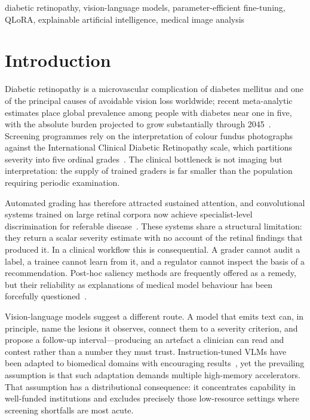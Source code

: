 \documentclass[conference]{IEEEtran}
\begin{document}
\begin{IEEEkeywords}
diabetic retinopathy, vision-language models, parameter-efficient fine-tuning,
QLoRA, explainable artificial intelligence, medical image analysis
\end{IEEEkeywords}

\section{Introduction}

Diabetic retinopathy is a microvascular complication of diabetes mellitus and one
of the principal causes of avoidable vision loss worldwide; recent
meta-analytic estimates place global prevalence among people with diabetes near
one in five, with the absolute burden projected to grow substantially through
2045~\cite{teo2021global}. Screening programmes rely on the interpretation of
colour fundus photographs against the International Clinical Diabetic
Retinopathy scale, which partitions severity into five ordinal
grades~\cite{wilkinson2003proposed}. The clinical bottleneck is not imaging but
interpretation: the supply of trained graders is far smaller than the population
requiring periodic examination.

Automated grading has therefore attracted sustained attention, and
convolutional systems trained on large retinal corpora now achieve
specialist-level discrimination for referable
disease~\cite{gulshan2016development,ting2017development}. These systems share a
structural limitation: they return a scalar severity estimate with no account of
the retinal findings that produced it. In a clinical workflow this is
consequential. A grader cannot audit a label, a trainee cannot learn from it, and
a regulator cannot inspect the basis of a recommendation. Post-hoc saliency
methods are frequently offered as a remedy, but their reliability as
explanations of medical model behaviour has been forcefully
questioned~\cite{ghassemi2021false}.

Vision-language models suggest a different route. A model that emits text can, in
principle, name the lesions it observes, connect them to a severity criterion, and
propose a follow-up interval---producing an artefact a clinician can read and
contest rather than a number they must trust. Instruction-tuned VLMs have been
adapted to biomedical domains with encouraging
results~\cite{li2023llavamed,liu2023llava}, yet the prevailing assumption is that
such adaptation demands multiple high-memory accelerators. That assumption has a
distributional consequence: it concentrates capability in well-funded
institutions and excludes precisely those low-resource settings where screening
shortfalls are most acute.
\end{document}
